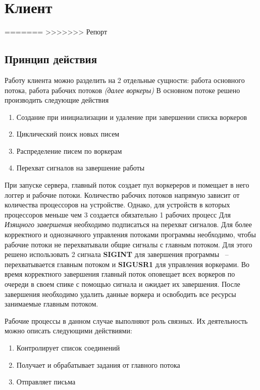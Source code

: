 \documentclass[a4paper,12pt]{report}
\begin{document}
\section*{Клиент}

=======
>>>>>>> Репорт
\subsection{Принцип действия}
Работу клиента можно разделить на 2 отдельные сущности: работа основного потока, работа рабочих потоков \textit{(далее воркеры)}
В основном потоке решено производить следующие действия
\begin{enumerate}
    \item Создание при инициализации и удаление при завершении списка воркеров
    \item Циклический поиск новых писем
    \item Распределение писем по воркерам
    \item Перехват сигналов на завершение работы
\end{enumerate}

При запуске сервера, главный поток создает пул воркереров и помещает в него логгер и рабочие потоки. Количество рабочих потоков напрямую зависит от количества процессоров на устройстве. Однако, для устройств в которых процессоров меньше чем 3 создается обязательно 1 рабочих процесс
Для \textit{Изящного завершения} необходимо подписаться на перехват сигналов. Для более корректного и однозначного управления потоками программы необходимо, чтобы рабочие потоки не перехватывали общие сигналы с главным потоком. Для этого решено использовать 2 сигнала \textbf{SIGINT} для завершения программы ~-- перехватывается главным потоком и \textbf{SIGUSR1} для управления воркерами. Во время корректного завершения главный поток оповещает всех воркеров по очереди в своем спике с помощью сигнала и ожидает их завершения. После завершения необходимо удалить данные воркера и освободить все ресурсы занимаемые главным потоком.

Рабочие процессы в данном случае выполняют роль связных. Их деятельность можно описать следующими действиями:
\begin{enumerate}
    \item Контролирует список соединений
    \item Получает и обрабатывает задания от главного потока
    \item Отправляет письма
\end{enumerate}
\end{document}
